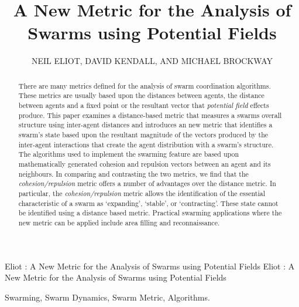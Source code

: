 \documentclass{ieeeaccess}
\begin{document}

\title{A New Metric for the Analysis of Swarms using Potential Fields}
\author{\uppercase{Neil Eliot},
\uppercase{David Kendall, and Michael Brockway}}
\address[1]{Northumbria University, Department of Computing and Information Sciences, 
Newcastle upon Tyne, NE1 8ST}

\markboth
{Eliot \headeretal: A New Metric for the Analysis of Swarms using Potential Fields}
{Eliot \headeretal: A New Metric for the Analysis of Swarms using Potential Fields}



\begin{abstract}
  There are many metrics defined for the analysis of swarm coordination algorithms. These metrics are usually based upon the distances between agents, the distance between agents and a fixed point or the resultant vector that \textit{potential field} effects produce. This paper examines a distance-based metric that measures a swarms overall structure using inter-agent distances and introduces an new metric that identifies a swarm's state based upon the resultant magnitude of the vectors produced by the inter-agent interactions that create the agent distribution with a swarm's structure. The algorithms used to implement the swarming feature are based upon mathematically generated cohesion and repulsion vectors between an agent and its neighbours. In comparing and contrasting the two metrics, we find that the \textit{cohesion/repulsion} metric offers a number of advantages over the distance metric. In particular, the \textit{cohesion/repulsion} metric allows the identification of the essential characteristic of a swarm as `expanding', `stable', or `contracting'. These state cannot be identified using a distance based metric. Practical swarming applications where the new metric can be applied include area filling and reconnaissance.
\end{abstract}

\begin{keywords}
Swarming, Swarm Dynamics, Swarm Metric, Algorithms.
\end{keywords}
\end{document}

